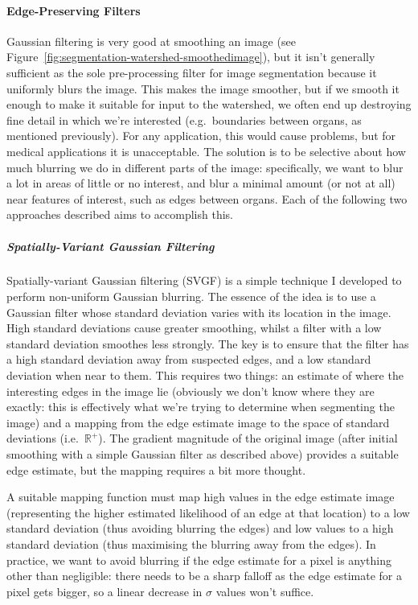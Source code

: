 \paragraph{Edge-Preserving Filters}

Gaussian filtering is very good at smoothing an image (see Figure~\ref{fig:segmentation-watershed-smoothedimage}), but it isn't generally sufficient as the sole pre-processing filter for image segmentation because it uniformly blurs the image. This makes the image smoother, but if we smooth it enough to make it suitable for input to the watershed, we often end up destroying fine detail in which we're interested (e.g.~boundaries between organs, as mentioned previously). For any application, this would cause problems, but for medical applications it is unacceptable. The solution is to be selective about how much blurring we do in different parts of the image: specifically, we want to blur a lot in areas of little or no interest, and blur a minimal amount (or not at all) near features of interest, such as edges between organs. Each of the following two approaches described aims to accomplish this.

\subparagraph{Spatially-Variant Gaussian Filtering}

Spatially-variant Gaussian filtering (SVGF) is a simple technique I developed to perform non-uniform Gaussian blurring. The essence of the idea is to use a Gaussian filter whose standard deviation varies with its location in the image. High standard deviations cause greater smoothing, whilst a filter with a low standard deviation smoothes less strongly. The key is to ensure that the filter has a high standard deviation away from suspected edges, and a low standard deviation when near to them. This requires two things: an estimate of where the interesting edges in the image lie (obviously we don't know where they are exactly: this is effectively what we're trying to determine when segmenting the image) and a mapping from the edge estimate image to the space of standard deviations (i.e.~$\mathbb{R}^+$). The gradient magnitude of the original image (after initial smoothing with a simple Gaussian filter as described above) provides a suitable edge estimate, but the mapping requires a bit more thought.

A suitable mapping function must map high values in the edge estimate image (representing the higher estimated likelihood of an edge at that location) to a low standard deviation (thus avoiding blurring the edges) and low values to a high standard deviation (thus maximising the blurring away from the edges). In practice, we want to avoid blurring if the edge estimate for a pixel is anything other than negligible: there needs to be a sharp falloff as the edge estimate for a pixel gets bigger, so a linear decrease in $\sigma$ values won't suffice.


